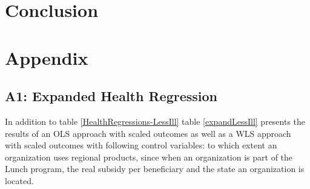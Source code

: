 \documentclass[12pt, a4paper, titlepage]{article}\usepackage[]{graphicx}\usepackage[]{color}
\begin{document}
\section{Conclusion}

\printbibliography

\section{Appendix}

\subsection{A1: Expanded Health Regression}

In addition to table \ref{HealthRegressions-LessIll} table \ref{expandLessIll} presents the results of an OLS approach with scaled outcomes as well as a WLS approach with scaled outcomes with following control variables: to which extent an organization uses regional products, since when an organization is part of the Lunch program, the real subsidy per beneficiary and the state an organization is located. 


% 
\end{document}
